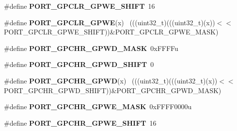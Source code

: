 \begin{DoxyCompactItemize}
\item 
\hypertarget{group___p_o_r_t___register___masks_ga340d6aadd9516b3cac26187b014ce9d3}{}\#define {\bfseries P\+O\+R\+T\+\_\+\+G\+P\+C\+L\+R\+\_\+\+G\+P\+W\+E\+\_\+\+S\+H\+I\+F\+T}~16\label{group___p_o_r_t___register___masks_ga340d6aadd9516b3cac26187b014ce9d3}

\item 
\hypertarget{group___p_o_r_t___register___masks_ga82584460ead116af92e0d8d2ce15a88e}{}\#define {\bfseries P\+O\+R\+T\+\_\+\+G\+P\+C\+L\+R\+\_\+\+G\+P\+W\+E}(x)                                          ~(((uint32\+\_\+t)(((uint32\+\_\+t)(x))$<$$<$P\+O\+R\+T\+\_\+\+G\+P\+C\+L\+R\+\_\+\+G\+P\+W\+E\+\_\+\+S\+H\+I\+F\+T))\&P\+O\+R\+T\+\_\+\+G\+P\+C\+L\+R\+\_\+\+G\+P\+W\+E\+\_\+\+M\+A\+S\+K)\label{group___p_o_r_t___register___masks_ga82584460ead116af92e0d8d2ce15a88e}

\item 
\hypertarget{group___p_o_r_t___register___masks_ga4f288d1140184d41384f459c263d6e63}{}\#define {\bfseries P\+O\+R\+T\+\_\+\+G\+P\+C\+H\+R\+\_\+\+G\+P\+W\+D\+\_\+\+M\+A\+S\+K}~0x\+F\+F\+F\+Fu\label{group___p_o_r_t___register___masks_ga4f288d1140184d41384f459c263d6e63}

\item 
\hypertarget{group___p_o_r_t___register___masks_gab4464bb98b737fbf75d42682fef3c09c}{}\#define {\bfseries P\+O\+R\+T\+\_\+\+G\+P\+C\+H\+R\+\_\+\+G\+P\+W\+D\+\_\+\+S\+H\+I\+F\+T}~0\label{group___p_o_r_t___register___masks_gab4464bb98b737fbf75d42682fef3c09c}

\item 
\hypertarget{group___p_o_r_t___register___masks_ga4bcc0d29943f201d35379c59dced6f5a}{}\#define {\bfseries P\+O\+R\+T\+\_\+\+G\+P\+C\+H\+R\+\_\+\+G\+P\+W\+D}(x)                                          ~(((uint32\+\_\+t)(((uint32\+\_\+t)(x))$<$$<$P\+O\+R\+T\+\_\+\+G\+P\+C\+H\+R\+\_\+\+G\+P\+W\+D\+\_\+\+S\+H\+I\+F\+T))\&P\+O\+R\+T\+\_\+\+G\+P\+C\+H\+R\+\_\+\+G\+P\+W\+D\+\_\+\+M\+A\+S\+K)\label{group___p_o_r_t___register___masks_ga4bcc0d29943f201d35379c59dced6f5a}

\item 
\hypertarget{group___p_o_r_t___register___masks_ga5e60b77e9d69fc09654c8034e31df7b5}{}\#define {\bfseries P\+O\+R\+T\+\_\+\+G\+P\+C\+H\+R\+\_\+\+G\+P\+W\+E\+\_\+\+M\+A\+S\+K}~0x\+F\+F\+F\+F0000u\label{group___p_o_r_t___register___masks_ga5e60b77e9d69fc09654c8034e31df7b5}

\item 
\hypertarget{group___p_o_r_t___register___masks_gacbc69d159ff1e697736d296bbc95566d}{}\#define {\bfseries P\+O\+R\+T\+\_\+\+G\+P\+C\+H\+R\+\_\+\+G\+P\+W\+E\+\_\+\+S\+H\+I\+F\+T}~16\label{group___p_o_r_t___register___masks_gacbc69d159ff1e697736d296bbc95566d}


\end{DoxyCompactItemize}

